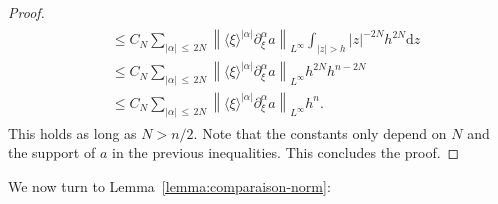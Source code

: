 \documentclass[10pt]{amsart}
\theoremstyle{definition}\newtheorem{defi}[theo]{Definition}\newtheorem{rema}[theo]{Remark}\newtheorem{exam}[theo]{Example}\newtheorem{exem}[theo]{Example}\newtheorem{nota}[theo]{Notation}
\newcommand{\dd}{\mathrm{d}}
\begin{document}
\begin{proof}
\begin{multline*}
\begin{aligned}
& \leq C_N \sum_{|\alpha|\,\leq\,2N} \left\|\langle \xi \rangle^{|\alpha|} \partial^\alpha_\xi a\right\|_{L^\infty} \int_{|z| > h} |z|^{-2N} h^{2N} \dd z \\
& \leq C_N \sum_{|\alpha|\,\leq\,2N} \left\|\langle \xi \rangle^{|\alpha|} \partial^\alpha_\xi a\right\|_{L^\infty} h^{2N} h^{n-2N} \\
& \leq C_N \sum_{|\alpha|\,\leq\,2N} \left\|\langle \xi \rangle^{|\alpha|} \partial^\alpha_\xi a\right\|_{L^\infty} h^{n}.
\end{aligned}
\end{multline*}
This holds as long as $N > n/2$. Note that the constants only depend on $N$ and the support of $a$ in the previous inequalities. This concludes the proof.
\end{proof}

We now turn to Lemma~\ref{lemma:comparaison-norm}:
\end{document}
